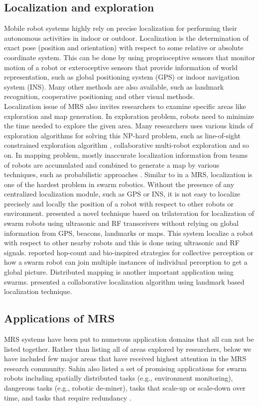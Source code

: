 \subsection*{Localization and exploration}
\label{bg:mrs:loc}
Mobile robot systems highly rely on precise localization for performing their autonomous activities in indoor or outdoor. Localization is the determination of exact pose (position and orientation) with respect to some relative or absolute coordinate system. This can be done by using proprioceptive sensors that monitor motion of a robot or exteroceptive sensors that provide information of world representation, such as global positioning system (GPS) or indoor navigation system (INS). Many other methods are also available, such as landmark recognition, cooperative positioning and other visual methods.\\
Localization issue of MRS also invites researchers to examine specific areas like exploration and map generation. In exploration problem, robots need to minimize the time needed to explore the given area. Many researchers uses various kinds of exploration algorithms for solving this NP-hard problem, such as line-of-sight constrained exploration algorithm \cite{Arkin+2002}, collaborative multi-robot exploration \cite{Burgard+2000} and so on. In mapping problem, mostly inaccurate localization information from teams of robots are accumulated and combined to generate a map by various techniques, such as probabilistic approaches \cite{Thurn+2000}.
Similar to in a MRS, localization is one of the hardest problem in swarm robotics. Without the presence of any centralized localization module, such as GPS or INS, it is not easy to localize precisely and locally the position of a robot with respect to other robots or environment. \cite{Spears+2006} presented a novel technique based on trilateration for localization of swarm robots using ultrasonic and RF transceivers without relying on global information from GPS, beacons, landmarks or maps. This system localize a robot with respect to other nearby robots and this is done using ultrasonic and RF signals. \cite{Schmickl+2006} reported hop-count and bio-inspired strategies for collective perception or how a swarm robot can join multiple instances of individual perception to get a global picture. Distributed mapping is another important application using swarms. \cite{Rothermich+05} presented a collaborative localization algorithm using landmark based localization technique.

\subsection*{Applications of MRS}
\label{bg:app}
MRS systems have been put to numerous application domains that all can not be listed together. Rather than listing all of areas explored by researchers, below we have included few major areas that have received highest attention in the MRS research community. Sahin also listed a set of promising applications for swarm robots including spatially distributed tasks (e.g., environment monitoring), dangerous tasks (e.g., robotic de-miner), tasks that scale-up or scale-down over time, and tasks that require redundancy \cite{Sahin+2005}.
